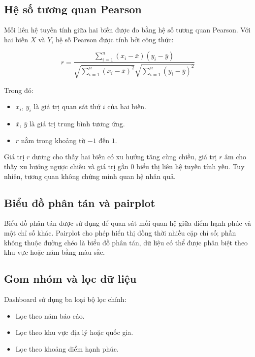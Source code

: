 \subsection{Hệ số tương quan Pearson}

Mối liên hệ tuyến tính giữa hai biến được đo bằng hệ số tương quan Pearson. Với hai biến $X$ và $Y$, hệ số Pearson được tính bởi công thức:

\begin{equation}
r = \frac{\sum_{i=1}^{n}(x_i-\bar{x})(y_i-\bar{y})}
{\sqrt{\sum_{i=1}^{n}(x_i-\bar{x})^2}
\sqrt{\sum_{i=1}^{n}(y_i-\bar{y})^2}}
\label{pt:pearson}
\end{equation}

Trong đó:

\begin{itemize}
    \item $x_i$, $y_i$ là giá trị quan sát thứ $i$ của hai biến.
    \item $\bar{x}$, $\bar{y}$ là giá trị trung bình tương ứng.
    \item $r$ nằm trong khoảng từ $-1$ đến $1$.
\end{itemize}

Giá trị $r$ dương cho thấy hai biến có xu hướng tăng cùng chiều, giá trị $r$ âm cho thấy xu hướng ngược chiều và giá trị gần $0$ biểu thị liên hệ tuyến tính yếu. Tuy nhiên, tương quan không chứng minh quan hệ nhân quả.

\subsection{Biểu đồ phân tán và pairplot}

Biểu đồ phân tán được sử dụng để quan sát mối quan hệ giữa điểm hạnh phúc và một chỉ số khác. Pairplot cho phép hiển thị đồng thời nhiều cặp chỉ số; phần không thuộc đường chéo là biểu đồ phân tán, dữ liệu có thể được phân biệt theo khu vực hoặc năm bằng màu sắc.

\subsection{Gom nhóm và lọc dữ liệu}

Dashboard sử dụng ba loại bộ lọc chính:

\begin{itemize}
    \item Lọc theo năm báo cáo.
    \item Lọc theo khu vực địa lý hoặc quốc gia.
    \item Lọc theo khoảng điểm hạnh phúc.
\end{itemize}

